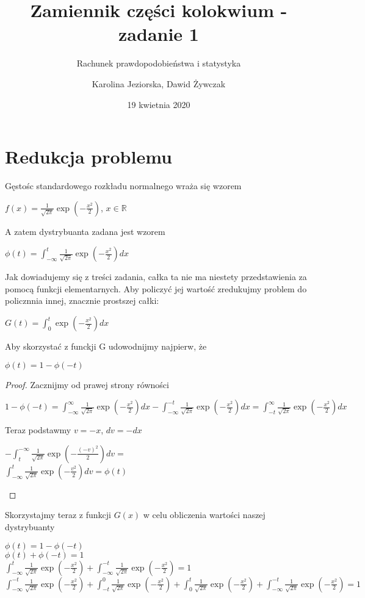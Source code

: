 \documentclass[a4paper]{scrartcl}
\title{Zamiennik części kolokwium - zadanie 1}
\subtitle{Rachunek prawdopodobieństwa i statystyka}
\author{Karolina Jeziorska, Dawid Żywczak}
\date{19 kwietnia 2020}
\begin{document}
\maketitle
\tableofcontents
\clearpage
\section{Redukcja problemu}
Gęstośc standardowego rozkładu normalnego wraża się wzorem
\begin{center}
$ f(x)=\frac{1}{\sqrt{2\pi}}\exp(-\frac{x^2}{2})$, $x \in \mathbb{R}$
\end{center}
A zatem dystrybuanta zadana jest wzorem
\begin{center}
$ \phi(t)=\int^{t}_{-\infty} \frac{1}{\sqrt{2\pi}}\exp(-\frac{x^2}{2}) dx$
\end{center}
Jak dowiadujemy się z treści zadania, całka ta nie ma niestety przedstawienia za pomocą funkcji elementarnych. Aby policzyć jej wartość zredukujmy problem do policznnia innej, znacznie prostszej całki:
\begin{center}
$ G(t)=\int^{t}_{0}\exp(-\frac{x^2}{2}) dx$
\end{center}
Aby skorzystać z funckji G udowodnijmy najpierw, że
\begin{center}
$\phi(t) = 1 - \phi(-t)$
\end{center}
\begin{proof}
Zacznijmy od prawej strony równości
\begin{center}
$1 - \phi(-t) = 
\int^{\infty}_{-\infty} \frac{1}{\sqrt{2\pi}}\exp(-\frac{x^2}{2})dx - \int^{-t}_{-\infty} \frac{1}{\sqrt{2\pi}}\exp(-\frac{x^2}{2})dx = \int^{\infty}_{-t} \frac{1}{\sqrt{2\pi}}\exp(-\frac{x^2}{2})dx$
\end{center}
Teraz podstawmy $v = -x$, $dv=-dx$
\begin{center}
$-\int^{-\infty}_{t} \frac{1}{\sqrt{2\pi}}\exp(-\frac{(-v)^2}{2})dv =$\\
$\int^{t}_{-\infty} \frac{1}{\sqrt{2\pi}}\exp(-\frac{v^2}{2})dv = \phi(t)$
\end{center}
\end{proof}
Skorzystajmy teraz z funkcji $G(x)$ w celu obliczenia wartości naszej dystrybuanty
\begin{center}
$\phi(t) = 1 - \phi(-t)$\\
$\phi(t) + \phi(-t) = 1$\\
$\int^{t}_{-\infty} \frac{1}{\sqrt{2\pi}}\exp(-\frac{x^2}{2}) + \int^{-t}_{-\infty} \frac{1}{\sqrt{2\pi}}\exp(-\frac{x^2}{2}) = 1$\\
$\int^{-t}_{-\infty} \frac{1}{\sqrt{2\pi}}\exp(-\frac{x^2}{2}) + 
\int^{0}_{-t} \frac{1}{\sqrt{2\pi}}\exp(-\frac{x^2}{2}) + 
\int^{t}_{0} \frac{1}{\sqrt{2\pi}}\exp(-\frac{x^2}{2}) +
\int^{-t}_{-\infty} \frac{1}{\sqrt{2\pi}}\exp(-\frac{x^2}{2}) = 1$
\end{center}
\end{document}

